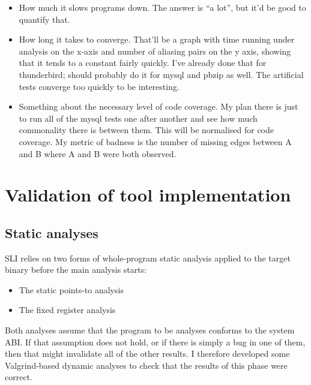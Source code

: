 \begin{itemize}
\item How much it slows programs down.  The answer is ``a lot'', but
  it'd be good to quantify that.
\item How long it takes to converge.  That'll be a graph with time
  running under analysis on the x-axis and number of aliasing pairs on
  the y axis, showing that it tends to a constant fairly quickly.
  I've already done that for thunderbird; should probably do it for
  mysql and pbzip as well.  The artificial tests converge too quickly
  to be interesting.
\item Something about the necessary level of code coverage.  My plan
  there is just to run all of the mysql tests one after another and
  see how much commonality there is between them.  This will be
  normalised for code coverage.  My metric of badness is the number of
  missing edges between A and B where A and B were both observed.
\end{itemize}

\section{Validation of tool implementation}
\label{sect:eval:validation}

\subsection{Static analyses}

SLI relies on two forms of whole-program static analysis applied to
the target binary before the main analysis starts:

\begin{itemize}
\item
  The static points-to analysis
\item
  The fixed register analysis
\end{itemize}

Both analyses assume that the program to be analyses conforms to the
system ABI.  If that assumption does not hold, or if there is simply a
bug in one of them, then that might invalidate all of the other
results.  I therefore developed some Valgrind-based dynamic analyses
to check that the results of this phase were correct.


